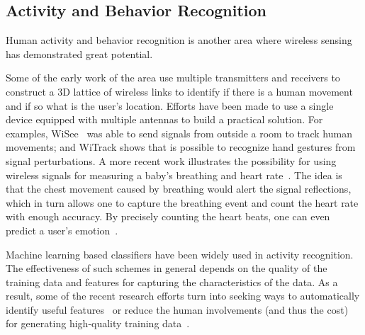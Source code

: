 \subsection{Activity and Behavior Recognition}
Human activity and behavior recognition is another area where wireless sensing has demonstrated great potential.

Some of the early work of the area use multiple transmitters and receivers to construct a 3D lattice of wireless links to identify if there
is a human movement and if so what is the user's location. Efforts have been made to use a single device equipped with multiple antennas to
build a practical solution. For examples, WiSee~\cite{} was able to send signals from outside a room to track human movements; and WiTrack
shows that is possible to recognize hand gestures from signal perturbations. A more recent work illustrates the possibility for using
wireless signals for measuring a baby's breathing and heart rate~\cite{ Smart-homes}. The idea is that the chest movement caused by
breathing would alert the signal reflections, which in turn allows one to capture the breathing event and count the heart rate with enough
accuracy. By precisely counting the heart beats, one can even predict a user's emotion~\cite{}.

Machine learning based classifiers have been widely used in activity recognition. The effectiveness of such schemes in general depends on
the quality of the training data and features for capturing the characteristics of the data. As a result, some of the recent research
efforts turn into seeking ways to automatically identify useful features~\cite{CrossSense} or reduce the human involvements (and thus the
 cost) for generating high-quality training data~\cite{zhao2018rf}.


